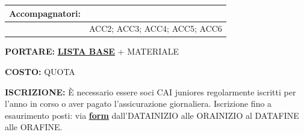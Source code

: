\documentclass[12pt]{article}
\begin{document}
\vspace{0.3cm}

\noindent
{\small
\begin{tabular}{|p{3.5cm}|p{\dimexpr\textwidth-3.5cm-4\tabcolsep-3\arrayrulewidth\relax}|}
\hline
\rowcolor{celeste}\textbf{Accompagnatori:} & \cellcolor{arancione}{{{ACC1}}} \\ 
\hline
 & {{ACC2}}; {{ACC3}}; {{ACC4}}; {{ACC5}}; {{ACC6}}  \\
\hline
\end{tabular}
}

\vspace{0.3cm}

\noindent
{\small
\textbf{PORTARE:} \href{https://www.cairoma.it/?page_id=22206}{\textbf{LISTA BASE}} + {{MATERIALE}}

\vspace{0.2cm}
\noindent
\textbf{COSTO:} {{QUOTA}}

\vspace{0.2cm}
\noindent
\textbf{ISCRIZIONE:} È necessario essere soci CAI juniores regolarmente iscritti per l'anno in corso o aver pagato l'assicurazione giornaliera.
Iscrizione fino a esaurimento posti: via \href{{{LINKISCRIZIONE}}}{\textbf{form}} dall'{{DATAINIZIO}} alle {{ORAINIZIO}} al {{DATAFINE}} alle {{ORAFINE}}.
}
\end{document}

